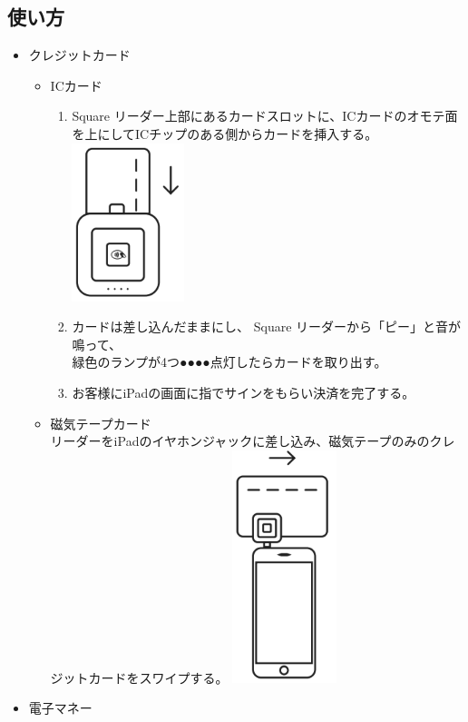 \documentclass[dvipdfmx,jb5]{jarticle}
\begin{document}
 \subsection{使い方}
 \begin{itemize}
  \item クレジットカード
  \begin{itemize}
  \item ICカード
  \begin{enumerate}[手順1]
   \item Square リーダー上部にあるカードスロットに、ICカードのオモテ面を上にしてICチップのある側からカードを挿入する。\\
   \includegraphics[scale=0.4]{assets/square_insert-card.png}
   \item カードは差し込んだままにし、 Square リーダーから「ピー」と音が鳴って、\\緑色のランプが4つ{\color{green}●●●●}点灯したらカードを取り出す。
   \item お客様にiPadの画面に指でサインをもらい決済を完了する。
  \end{enumerate}
  \item 磁気テープカード\\
  リーダーをiPadのイヤホンジャックに差し込み、磁気テープのみのクレジットカードをスワイプする。
  \includegraphics[scale=0.4]{assets/square_slide-card.png}
  \end{itemize}
  \item 電子マネー\\

\end{itemize}
\end{document}
